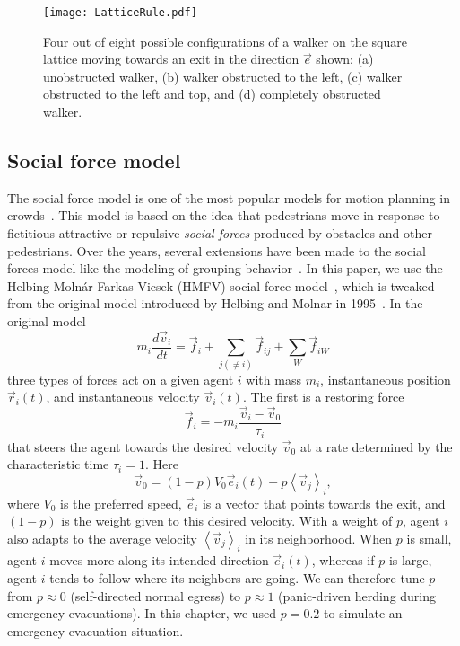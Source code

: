 \begin{figure}[!htb]
\centering
\texttt{[image: LatticeRule.pdf]}
\caption{Four out of eight possible configurations of a walker on the square lattice moving towards an exit in the direction $\vec{e}$ shown: (a) unobstructed walker, (b) walker obstructed to the left, (c) walker obstructed to the left and top, and (d) completely obstructed walker.}
\label{fig:latticeGasMovement}
\end{figure}



\subsection{Social force model}
\label{SocialForceModel}

The social force model is one of the most popular models for motion planning in crowds~\cite{Kamphuis:2004uu,Xi:2010uc,Peng:2009cc}. This model is based on the idea that pedestrians move in response to fictitious attractive or repulsive \emph{social forces} produced by obstacles and other pedestrians.  Over the years, several extensions have been made to the social forces model like the modeling of grouping behavior~\cite{Kamphuis:2004uu}. In this paper, we use the Helbing-Moln\'ar-Farkas-Vicsek (HMFV) social force model~\cite{PhysRevE.51.4282}, which is tweaked from the original model introduced by Helbing and Molnar in 1995~\cite{PhysRevE.51.4282}. In the original model
\begin{equation} \label{eqn:SFeqn}
m_i \frac{d\vec{v}_i}{dt}=\vec{f}_{i}+\sum_{j(\neq i)}\vec{f}_{ij}+\sum_{W}\vec{f}_{iW}
\end{equation}
three types of forces act on a given agent $i$ with mass $m_i$, instantaneous position $\vec{r}_i(t)$, and instantaneous velocity $\vec{v}_i(t)$. The first is a restoring force
\begin{equation}
\vec{f}_i = -m_i \frac{\vec{v}_i-\vec{v}_0}{\tau_i}
\end{equation}
that steers the agent towards the desired velocity $\vec{v}_0$ at a rate determined by the characteristic time $\tau_i = 1$. Here
\begin{equation}
\vec{v}_0=(1-p)V_0\vec{e}_i(t)+p\left<\vec{v}_j\right>_i,
\end{equation}
where $V_0$ is the preferred speed, $\vec{e}_i$ is a vector that points towards the exit, and $(1 - p)$ is the weight given to this desired velocity. With a weight of $p$, agent $i$ also adapts to the average velocity $\left<\vec{v}_j\right>_i$ in its neighborhood. When $p$ is small, agent $i$ moves more along its intended direction $\vec{e}_i(t)$, whereas if $p$ is large, agent $i$ tends to follow where its neighbors are going. We can therefore tune $p$ from $p \approx 0$ (self-directed normal egress) to $p \approx 1$ (panic-driven herding during emergency evacuations). In this chapter, we used $p = 0.2$ to simulate an emergency evacuation situation.

